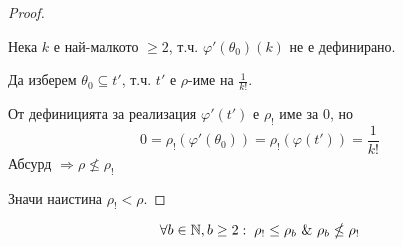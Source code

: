 \begin{proof}
\begin{itemize}
        Нека $k$ е най-малкото $\geq 2$, т.ч. $\varphi'(\theta_0)(k)$ не е дефинирано.
        
        Да изберем $\theta_0 \subseteq t'$, т.ч. $t'$ е $\rho$-име на $\frac{1}{k!}$.

        От дефиницията за реализация $\varphi'(t')$ е $\rho_!$ име за $0$, но
        \begin{equation}
            0 = \rho_!(\varphi'(\theta_0)) = \rho_!(\varphi(t')) = \frac{1}{k!} 
        \end{equation}
        Абсурд $\Rightarrow \rho \nleq \rho_!$
        \end{itemize}
        Значи наистина $\rho_! < \rho$.
    \end{proof}
    
    \begin{proposition}
        \begin{equation}
            \forall b \in {\mathbb{N}}, b\geq 2:\; \rho_! \leq \rho_b\ \&\ \rho_b \nleq \rho_!
        \end{equation}
    \end{proposition}
